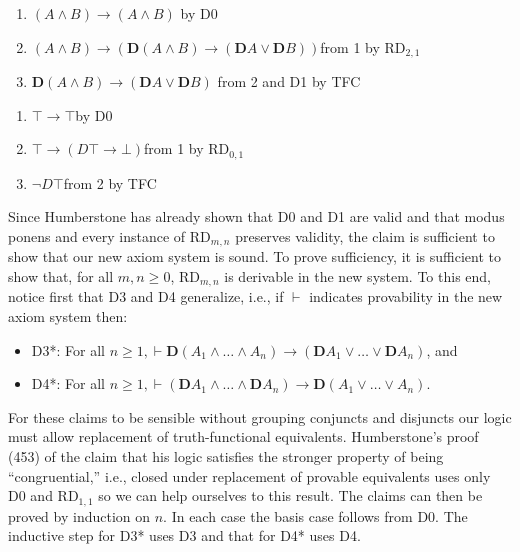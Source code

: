 \documentclass[
  11pt,
  letterpaper,
  DIV=11,
  numbers=noendperiod,
  twoside]{scrartcl}
\providecommand{\tightlist}{%
  \setlength{\itemsep}{0pt}\setlength{\parskip}{0pt}}
\begin{document}
\begin{enumerate}
\def\labelenumi{\arabic{enumi}.}
\tightlist
\item
  \((A\wedge B)\rightarrow (A\wedge B)\) by D0
\item
  \((A\wedge B)\rightarrow (\mathbf{D}(A\wedge B)\rightarrow (\mathbf{D}A\vee \mathbf{D}B))\)from
  1 by RD\(_{2,1}\)
\item
  \(\mathbf{D}(A\wedge B)\rightarrow (\mathbf{D}A\vee \mathbf{D}B)\)
  from 2 and D1 by TFC
\end{enumerate}

\begin{enumerate}
\def\labelenumi{\arabic{enumi}.}
\tightlist
\item
  \(\top \rightarrow \top\)by D0
\item
  \(\top \rightarrow (D\top \rightarrow \bot)\)from 1 by RD\(_{0,1}\)
\item
  \(\neg D\top\)from 2 by TFC
\end{enumerate}

Since Humberstone has already shown that D0 and D1 are valid and that
modus ponens and every instance of RD\(_{m,n}\) preserves validity, the
claim is sufficient to show that our new axiom system is sound. To prove
sufficiency, it is sufficient to show that, for all \(m,n\!\ge\!0\),
RD\(_{m,n}\) is derivable in the new system. To this end, notice first
that D3 and D4 generalize, i.e., if \(\vdash\) indicates provability in
the new axiom system then:

\begin{itemize}
\tightlist
\item
  D3*: For all
  \(n{\ge}1, \vdash \mathbf{D}(A_1\wedge {\ldots}\wedge A_n) \rightarrow (\mathbf{D}A_1\vee {\ldots}\vee \mathbf{D}A_n)\),
  and
\item
  D4*: For all
  \(n{\ge}1, \vdash (\mathbf{D}A_1\wedge {\ldots}\wedge \mathbf{D}A_n) \rightarrow \mathbf{D}(A_1\vee {\ldots}\vee A_n)\).
\end{itemize}

For these claims to be sensible without grouping conjuncts and disjuncts
our logic must allow replacement of truth-functional equivalents.
Humberstone's proof (453) of the claim that his logic satisfies the
stronger property of being ``congruential,'' i.e., closed under
replacement of provable equivalents uses only D0 and RD\(_{1,1}\) so we
can help ourselves to this result. The claims can then be proved by
induction on \(n\). In each case the basis case follows from D0. The
inductive step for D3* uses D3 and that for D4* uses D4.
\end{document}
